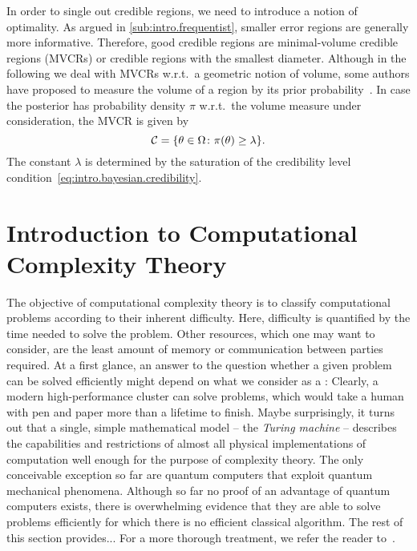 In order to single out  credible regions, we need to introduce a notion of optimality.
As argued in \cref{sub:intro.frequentist}, smaller error regions are generally more informative.
Therefore, good credible regions are minimal-volume credible regions (MVCRs) or credible regions with the smallest diameter.
Although in the following we deal with MVCRs w.r.t.\ a geometric notion of volume, some authors have proposed to measure the volume of a region by its prior probability~\cite{Evans_2006_Optimally,Shang_2013_Optimal}.
In case the posterior has probability density $\pi$ w.r.t.\ the volume measure under consideration, the MVCR is given by
\[
  \label{eq:intro.bayesian.mvcr}
  \mathcal{C} = \{ \theta \in \Omega\colon \pi(\theta) \ge \lambda \}.
\]
The constant $\lambda$ is determined by the saturation of the credibility level condition~\eqref{eq:intro.bayesian.credibility}.




\section{Introduction to Computational Complexity Theory}
\label{sec:error.complexity}


The objective of computational complexity theory is to classify computational problems according to their inherent difficulty.
Here, difficulty is quantified by the time needed to solve the problem.
Other resources, which one may want to consider, are the least amount of memory or communication between parties required.
At a first glance, an answer to the question whether a given problem can be solved efficiently might depend on what we consider as a :
Clearly, a modern high-performance cluster can solve problems, which would take a human with pen and paper more than a lifetime to finish.
Maybe surprisingly, it turns out that a single, simple mathematical model -- the \emph{Turing machine} -- describes the capabilities and restrictions of almost all physical implementations of computation well enough for the purpose of complexity theory.
The only conceivable exception so far are quantum computers that exploit quantum mechanical phenomena.
Although so far no proof of an advantage of quantum computers exists, there is overwhelming evidence that they are able to solve problems efficiently for which there is no efficient classical algorithm.
The rest of this section provides...
For a more thorough treatment, we refer the reader to~\cite{Arora_2009_Computational}.

